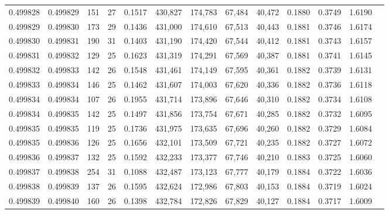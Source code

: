 \begin{tabular}{rrrrrrrrrrrrr}
0.499828 & 0.499829 & 151 &  27 &                                     0.1517 & 430,827 & 174,783 &  67,484 &  40,472 & 0.1880 & 0.3749 & 1.6190 \\
0.499829 & 0.499830 & 173 &  29 &                                     0.1436 & 431,000 & 174,610 &  67,513 &  40,443 & 0.1881 & 0.3746 & 1.6174 \\
0.499830 & 0.499831 & 190 &  31 &                                     0.1403 & 431,190 & 174,420 &  67,544 &  40,412 & 0.1881 & 0.3743 & 1.6157 \\
0.499831 & 0.499832 & 129 &  25 &                                     0.1623 & 431,319 & 174,291 &  67,569 &  40,387 & 0.1881 & 0.3741 & 1.6145 \\
0.499832 & 0.499833 & 142 &  26 &                                     0.1548 & 431,461 & 174,149 &  67,595 &  40,361 & 0.1882 & 0.3739 & 1.6131 \\
0.499833 & 0.499834 & 146 &  25 &                                     0.1462 & 431,607 & 174,003 &  67,620 &  40,336 & 0.1882 & 0.3736 & 1.6118 \\
0.499834 & 0.499834 & 107 &  26 &                                     0.1955 & 431,714 & 173,896 &  67,646 &  40,310 & 0.1882 & 0.3734 & 1.6108 \\
0.499834 & 0.499835 & 142 &  25 &                                     0.1497 & 431,856 & 173,754 &  67,671 &  40,285 & 0.1882 & 0.3732 & 1.6095 \\
0.499835 & 0.499835 & 119 &  25 &                                     0.1736 & 431,975 & 173,635 &  67,696 &  40,260 & 0.1882 & 0.3729 & 1.6084 \\
0.499835 & 0.499836 & 126 &  25 &                                     0.1656 & 432,101 & 173,509 &  67,721 &  40,235 & 0.1882 & 0.3727 & 1.6072 \\
0.499836 & 0.499837 & 132 &  25 &                                     0.1592 & 432,233 & 173,377 &  67,746 &  40,210 & 0.1883 & 0.3725 & 1.6060 \\
0.499837 & 0.499838 & 254 &  31 &                                     0.1088 & 432,487 & 173,123 &  67,777 &  40,179 & 0.1884 & 0.3722 & 1.6036 \\
0.499838 & 0.499839 & 137 &  26 &                                     0.1595 & 432,624 & 172,986 &  67,803 &  40,153 & 0.1884 & 0.3719 & 1.6024 \\
0.499839 & 0.499840 & 160 &  26 &                                     0.1398 & 432,784 & 172,826 &  67,829 &  40,127 & 0.1884 & 0.3717 & 1.6009 \\

\end{tabular}

